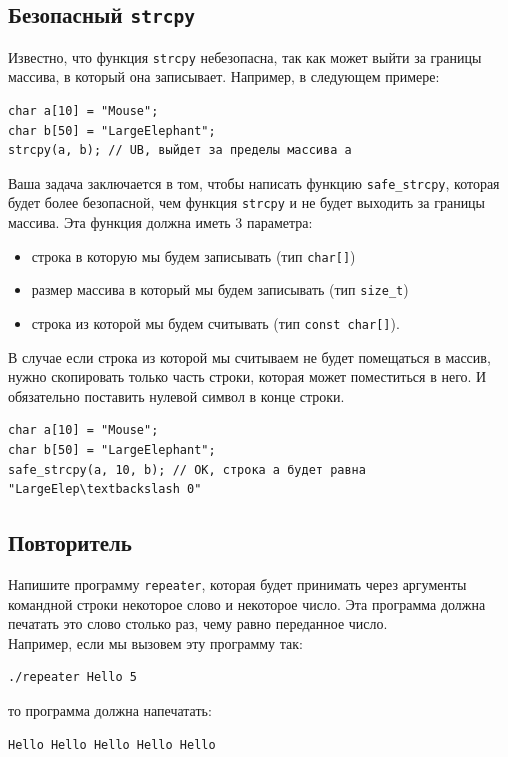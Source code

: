 \documentclass{article}
\begin{document}
\subsection{Безопасный \texttt{strcpy}}
Известно, что функция \texttt{strcpy} небезопасна, так как может выйти за границы массива, в который она записывает.
Например, в следующем примере:
\begin{lstlisting}
char a[10] = "Mouse";
char b[50] = "LargeElephant";
strcpy(a, b); // UB, выйдет за пределы массива a
\end{lstlisting}
Ваша задача заключается в том, чтобы написать функцию \texttt{safe\_strcpy}, которая будет более безопасной, чем функция \texttt{strcpy} и не будет выходить за границы массива. Эта функция должна иметь 3 параметра:
\begin{itemize}
\item строка в которую мы будем записывать (тип \texttt{char[]})
\item размер массива в который мы будем записывать (тип \texttt{size\_t})
\item строка из которой мы будем считывать (тип \texttt{const char[]}).
\end{itemize}
В случае если строка из которой мы считываем не будет помещаться в массив, нужно скопировать только часть строки, которая может поместиться в него. И обязательно поставить нулевой символ в конце строки.
\begin{lstlisting}
char a[10] = "Mouse";
char b[50] = "LargeElephant";
safe_strcpy(a, 10, b); // OK, строка a будет равна "LargeElep\textbackslash 0"
\end{lstlisting}



\subsection{Повторитель}
Напишите программу \texttt{repeater}, которая будет принимать через аргументы командной строки некоторое слово и некоторое число. Эта программа должна печатать это слово столько раз, чему равно переданное число.\\
Например, если мы вызовем эту программу так:
\begin{verbatim}
./repeater Hello 5
\end{verbatim}
то программа должна напечатать:
\begin{verbatim}
Hello Hello Hello Hello Hello
\end{verbatim}
\end{document}
